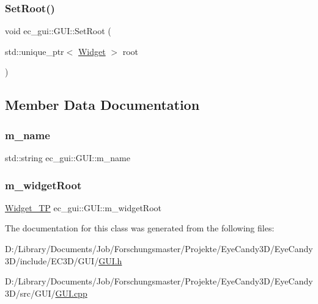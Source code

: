 \subsubsection{\texorpdfstring{Set\+Root()}{SetRoot()}}
{\footnotesize\ttfamily void ec\+\_\+gui\+::\+G\+U\+I\+::\+Set\+Root (\begin{DoxyParamCaption}\item[{std\+::unique\+\_\+ptr$<$ \mbox{\hyperlink{classec__gui_1_1_widget}{Widget}} $>$}]{root }\end{DoxyParamCaption})}



\subsection{Member Data Documentation}
\mbox{\label{classec__gui_1_1_g_u_i_a693e16eaaa1b1fcba80170ae8f1556e2}} 
\subsubsection{\texorpdfstring{m\+\_\+name}{m\_name}}
{\footnotesize\ttfamily std\+::string ec\+\_\+gui\+::\+G\+U\+I\+::m\+\_\+name\hspace{0.3cm}{\ttfamily [protected]}}

\mbox{\label{classec__gui_1_1_g_u_i_ad6b9982eb7b129a78c593da5008c2ac0}} 
\subsubsection{\texorpdfstring{m\+\_\+widget\+Root}{m\_widgetRoot}}
{\footnotesize\ttfamily \mbox{\hyperlink{classec__gui_1_1_g_u_i_a2b94294ea5a4ad9f8edcb4eb4d97151a}{Widget\+\_\+\+TP}} ec\+\_\+gui\+::\+G\+U\+I\+::m\+\_\+widget\+Root\hspace{0.3cm}{\ttfamily [protected]}}



The documentation for this class was generated from the following files\+:\begin{DoxyCompactItemize}
\item 
D\+:/\+Library/\+Documents/\+Job/\+Forschungsmaster/\+Projekte/\+Eye\+Candy3\+D/\+Eye\+Candy3\+D/include/\+E\+C3\+D/\+G\+U\+I/\mbox{\hyperlink{_g_u_i_8h}{G\+U\+I.\+h}}\item 
D\+:/\+Library/\+Documents/\+Job/\+Forschungsmaster/\+Projekte/\+Eye\+Candy3\+D/\+Eye\+Candy3\+D/src/\+G\+U\+I/\mbox{\hyperlink{_g_u_i_8cpp}{G\+U\+I.\+cpp}}\end{DoxyCompactItemize}
